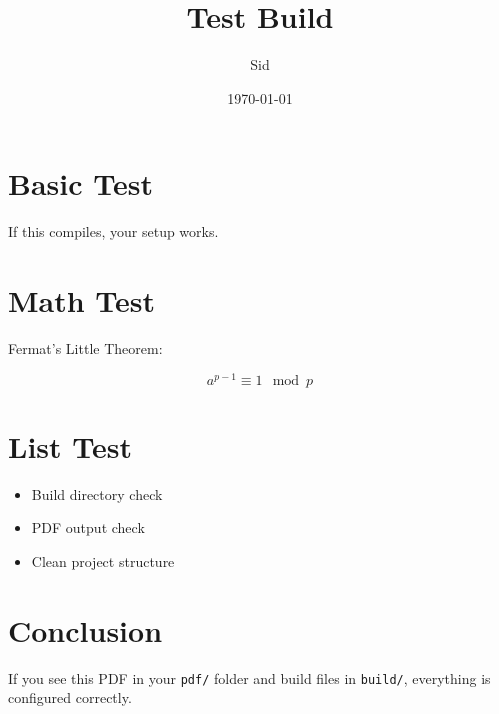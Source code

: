 \documentclass{article}
\title{Test Build}
\author{Sid}
\date{\today}
\begin{document}
\maketitle

\section{Basic Test}

If this compiles, your setup works.

\section{Math Test}

Fermat's Little Theorem:

\[
a^{p-1} \equiv 1 \mod p
\]

\section{List Test}

\begin{itemize}
    \item Build directory check
    \item PDF output check
    \item Clean project structure
\end{itemize}

\section{Conclusion}

If you see this PDF in your \texttt{pdf/} folder and build files in \texttt{build/}, everything is configured correctly.
\end{document}
